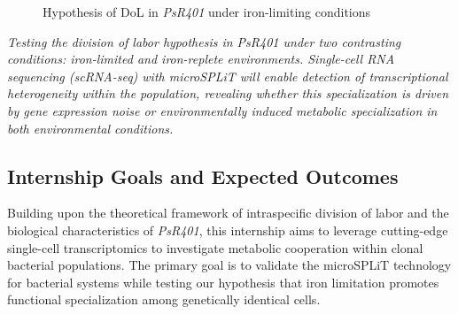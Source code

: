 \documentclass[
  11pt,
  a4paper,
]{report}
\begin{document}
\begin{figure}


\caption{\label{fig-hypothesis-iron}Hypothesis of DoL in \emph{PsR401}
under iron-limiting conditions}

\end{figure}%

\emph{Testing the division of labor hypothesis in PsR401 under two
contrasting conditions: iron-limited and iron-replete environments.
Single-cell RNA sequencing (scRNA-seq) with microSPLiT will enable
detection of transcriptional heterogeneity within the population,
revealing whether this specialization is driven by gene expression noise
or environmentally induced metabolic specialization in both
environmental conditions.}

\subsection{Internship Goals and Expected
Outcomes}\label{internship-goals-and-expected-outcomes}

Building upon the theoretical framework of intraspecific division of
labor and the biological characteristics of \emph{PsR401}, this
internship aims to leverage cutting-edge single-cell transcriptomics to
investigate metabolic cooperation within clonal bacterial populations.
The primary goal is to validate the microSPLiT technology for bacterial
systems while testing our hypothesis that iron limitation promotes
functional specialization among genetically identical cells.
\end{document}
